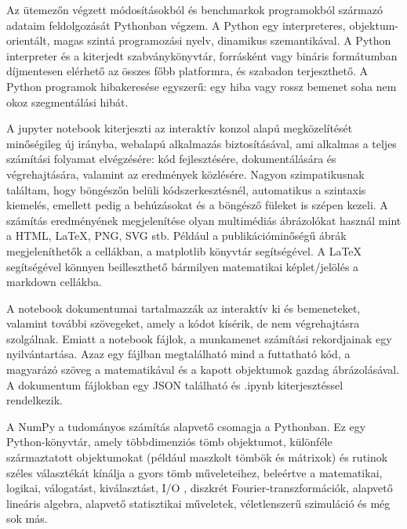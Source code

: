 Az ütemezőn végzett módosításokból és benchmarkok programokból származó adataim feldolgozását Pythonban végzem.
A Python egy interpreteres, objektum-orientált, magas szintá programozási nyelv, dinamikus szemantikával.
A Python interpreter és a kiterjedt szabványkönyvtár, forrásként vagy bináris formátumban díjmentesen elérhető az összes főbb platformra, és szabadon terjeszthető.
A Python programok hibakeresése egyszerű: egy hiba vagy rossz bemenet soha nem okoz szegmentálási hibát.

A jupyter notebook kiterjeszti az interaktív konzol alapú megközelítését minőségileg új irányba, webalapú alkalmazás biztosításával, ami alkalmas a teljes számítási folyamat elvégzésére: kód fejlesztésére, dokumentálására és végrehajtására, valamint az eredmények közlésére.
Nagyon szimpatikusnak találtam, hogy böngészőn belüli kódszerkesztésnél, automatikus a szintaxis kiemelés, emellett pedig a behúzásokat és a böngésző füleket is szépen kezeli.
A számítás eredményének megjelenítése olyan multimédiás ábrázolókat használ mint a HTML, LaTeX, PNG, SVG stb. Például a publikációminőségű ábrák megjeleníthetők a cellákban, a matplotlib könyvtár segítségével. A LaTeX segítségével könnyen beilleszthető bármilyen matematikai képlet/jelölés a markdown cellákba.

 A notebook dokumentumai tartalmazzák az interaktív ki és bemeneteket, valamint további szövegeket, amely a kódot kísérik, de nem végrehajtásra szolgálnak. 
Emiatt a notebook fájlok, a munkamenet számítási rekordjainak egy nyilvántartása. Azaz egy fájlban megtalálható mind a futtatható kód, a magyarázó szöveg a matematikával és a kapott objektumok gazdag ábrázolásával. A dokumentum fájlokban egy JSON található és .ipynb kiterjesztéssel rendelkezik.

A NumPy a tudományos számítás alapvető csomagja a Pythonban.
Ez egy Python-könyvtár, amely többdimenziós tömb objektumot, különféle származtatott objektumokat (például maszkolt tömbök és mátrixok) és rutinok széles választékát kínálja a gyors tömb műveleteihez, beleértve a matematikai, logikai, válogatást, kiválasztást, I/O , diszkrét Fourier-transzformációk, alapvető lineáris algebra, alapvető statisztikai műveletek, véletlenszerű szimuláció és még sok más.

